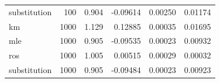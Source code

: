 \documentclass[12pt, twoside]{amherstthesis}
\begin{document}
\begin{table}
\begin{tabular}[t]{lrrrrr}
\hspace{1em}substitution & 100 & 0.904 & -0.09614 & 0.00250 & 0.01174\\
\hspace{1em}km & 1000 & 1.129 & 0.12885 & 0.00035 & 0.01695\\
\hspace{1em}mle & 1000 & 0.905 & -0.09535 & 0.00023 & 0.00932\\
\hspace{1em}ros & 1000 & 1.005 & 0.00515 & 0.00029 & 0.00032\\
\hspace{1em}substitution & 1000 & 0.905 & -0.09484 & 0.00023 & 0.00923\\
\bottomrule
\end{tabular}
\end{table}
\begin{table}


\end{table}
\end{document}
